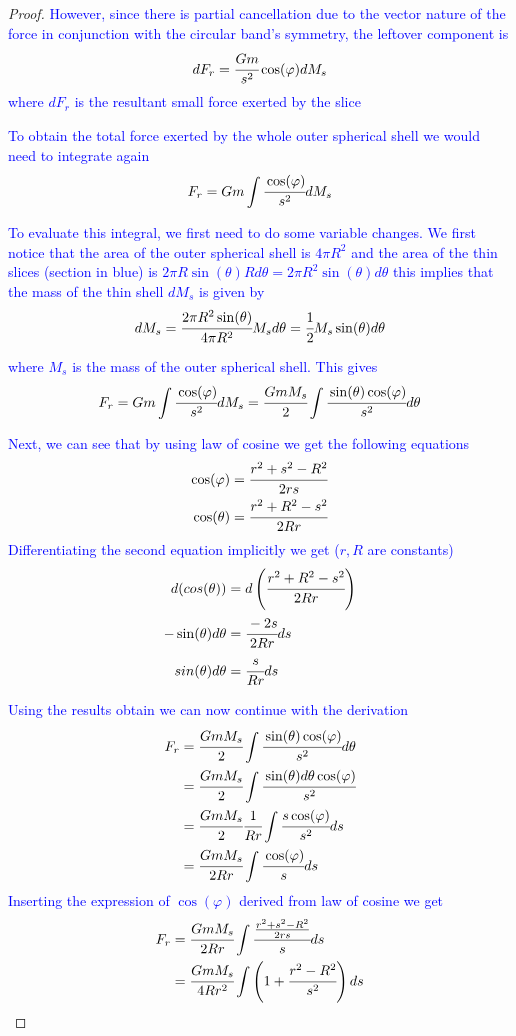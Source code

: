 \documentclass{article}
\begin{document}
\begin{proof}
\textcolor{blue}{However, since there is partial cancellation due to the vector nature of the force in conjunction with the circular band's symmetry, the leftover component is 
$$dF_r=\cfrac{Gm}{s^2}\cos (\varphi) dM_s $$
where $dF_r$ is the resultant small force exerted by the slice}

\textcolor{blue}{To obtain the total force exerted by the whole outer spherical shell we would need to integrate again 
$$F_r= Gm \int \cfrac{\cos (\varphi)}{s^2}dM_s$$}

\textcolor{blue}{To evaluate this integral, we first need to do some variable changes. We first notice that the area of the outer spherical shell is $4\pi R^2$ and the area of the thin slices (section in blue) is $2\pi R\sin(\theta)Rd\theta=2\pi R^2 \sin (\theta) d\theta$ this implies that the mass of the thin shell $dM_s$ is given by
$$dM_s=\cfrac{2\pi R^2 \sin (\theta) }{4\pi R^2}M_sd\theta=\cfrac{1}{2}M_s\sin(\theta) d\theta$$}

\textcolor{blue}{where $M_s$ is the mass of the outer spherical shell. This gives 
$$F_r= Gm \int \cfrac{\cos (\varphi)}{s^2}dM_s = \cfrac{GmM_s}{2}\int \cfrac{\sin(\theta)\cos(\varphi)}{s^2}d\theta$$}

\textcolor{blue}{Next, we can see that by using law of cosine we get the following equations
\begin{align*}
    \cos (\varphi)&=\cfrac{r^2+s^2-R^2}{2rs} \\ 
    \cos (\theta)&=\cfrac{r^2+R^2-s^2}{2Rr} 
\end{align*}
Differentiating the second equation implicitly we get ($r,R$ are constants)
\begin{align*}
    d(cos(\theta))&=d\left(\cfrac{r^2+R^2-s^2}{2Rr}\right) \\
    -\sin (\theta)d\theta&=\cfrac{-2s}{2Rr}ds \\
    sin(\theta)d\theta&=\cfrac{s}{Rr}ds
\end{align*}}

\textcolor{blue}{Using the results obtain we can now continue with the derivation 
\begin{align*}
      F_r &= \cfrac{GmM_s}{2}\int \cfrac{\sin(\theta)\cos(\varphi)}{s^2}d\theta\\ 
        &= \cfrac{GmM_s}{2}\int \cfrac{\sin(\theta)d\theta \cos (\varphi)}{s^2} \\ 
        &= \cfrac{GmM_s}{2} \cfrac{1}{Rr}\int \cfrac{s\cos (\varphi)}{s^2}ds \\ 
        &=  \cfrac{GmM_s}{2Rr}\int \cfrac{\cos (\varphi)}{s}ds
\end{align*}
Inserting the expression of $\cos (\varphi)$ derived from law of cosine we get 
\begin{align*}
    F_r& =\cfrac{GmM_s}{2Rr}\int \cfrac{\frac{r^2+s^2-R^2}{2rs}}{s}ds \\ 
        &= \cfrac{GmM_s}{4Rr^2} \int \left(1+\cfrac{r^2-R^2}{s^2}\right) ds
\end{align*}}


\end{proof}
\end{document}
